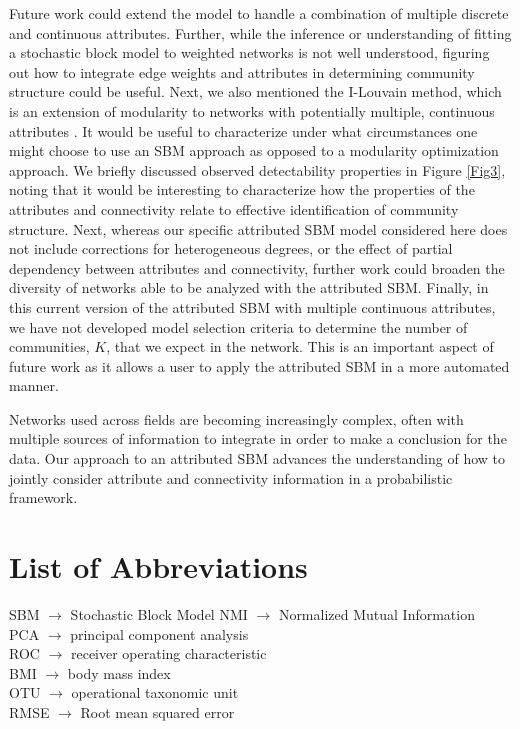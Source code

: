 Future work could extend the model to handle a combination of multiple discrete and continuous attributes. Further, while the inference or understanding of fitting a stochastic block model to weighted networks is not well understood, figuring out how to integrate edge weights and attributes in determining community structure could be useful. Next, we also mentioned the I-Louvain method, which is an extension of modularity to networks with potentially multiple, continuous attributes \cite{ilouvain}. It would be useful to characterize under what circumstances one might choose to use an SBM approach as opposed to a modularity optimization approach. We briefly discussed observed detectability properties in Figure \ref{Fig3}, noting that it would be interesting to characterize how the properties of the attributes and connectivity relate to effective identification of community structure. Next, whereas our specific attributed SBM model considered here does not include corrections for heterogeneous degrees, or the effect of partial dependency between attributes and connectivity, further work could broaden the diversity of networks able to be analyzed with the attributed SBM. Finally, in this current version of the attributed SBM with multiple continuous attributes, we have not developed model selection criteria to determine the number of communities, $K$, that we expect in the network. This is an important aspect of future work as it allows a user to apply the attributed SBM in a more automated manner. 

Networks used across fields are becoming increasingly complex, often with multiple sources of information to integrate in order to make a conclusion for the data. Our approach to an attributed SBM advances the understanding of how to jointly consider attribute and connectivity information in a probabilistic framework. 

\section{List of Abbreviations}
SBM $\rightarrow$ Stochastic Block Model
NMI $\rightarrow$ Normalized Mutual Information\\
PCA $\rightarrow$ principal component analysis\\
ROC $\rightarrow$ receiver operating characteristic \\
BMI $\rightarrow$ body mass index\\
OTU $\rightarrow$ operational taxonomic unit\\
RMSE $\rightarrow$ Root mean squared error

